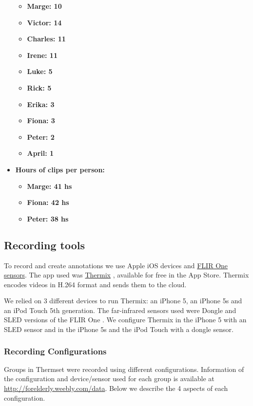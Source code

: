 \documentclass[oneside, twocolumn]{article}
\newcommand\FionaHours{42 hs}
\newcommand\MargeHours{41 hs}
\newcommand\PeterHours{38 hs}
\newcommand\MargeDays{10}
\newcommand\VictorDays{14}
\newcommand\CharlesDays{11}
\newcommand\IreneDays{11}
\newcommand\LukeDays{5}
\newcommand\RickDays{5}
\newcommand\ErikaDays{3}
\newcommand\FionaDays{3}
\newcommand\PeterDays{2}
\newcommand\AprilDays{1}
\begin{document}
\begin{itemize}
\begin{itemize}
    \item \textbf{Marge: \MargeDays{}}
    \item \textbf{Victor: \VictorDays{}}
    \item \textbf{Charles: \CharlesDays{}}
    \item \textbf{Irene: \IreneDays{}}
    \item \textbf{Luke: \LukeDays{}}
    \item \textbf{Rick: \RickDays{}}
    \item \textbf{Erika: \ErikaDays{}}
    \item \textbf{Fiona: \FionaDays{}}
    \item \textbf{Peter: \PeterDays{}}
    \item \textbf{April: \AprilDays{}}
    \fi
  \end{itemize}
  \item \textbf{Hours of clips per person:}
  \begin{itemize}
    \item \textbf{Marge: \MargeHours{}}
    \item \textbf{Fiona: \FionaHours{}}
    \item \textbf{Peter: \PeterHours{}}
  \end{itemize}
\end{itemize}

\subsection{Recording tools}
To record and create annotations we use Apple iOS devices and \href{http://www.flir.com/flirone/ios/}{FLIR One sensors}.
The app used was \href{http://appstore.com/thermixforflirone}{Thermix}\cite{thermix} ,
available for free in the App Store. Thermix encodes videos in H.264 format and sends them to the cloud.

We relied on 3 different devices to run Thermix: an iPhone 5, an iPhone 5s and an iPod Touch 5th generation.
The far-infrared sensors used were Dongle and SLED versions of the FLIR One \cite{sdk_flir_dongle}\cite{sdk_flir_sled}.
We configure Thermix in the iPhone 5 with an SLED sensor and in the iPhone 5s and the
iPod Touch with a dongle sensor.

\subsubsection{Recording Configurations}
Groups in Thermset were recorded using different configurations. Information of the configuration and device/sensor used
for each group is available at \url{http://forelderly.weebly.com/data}. Below we describe the 4 aspects of each
configuration.
\end{document}
